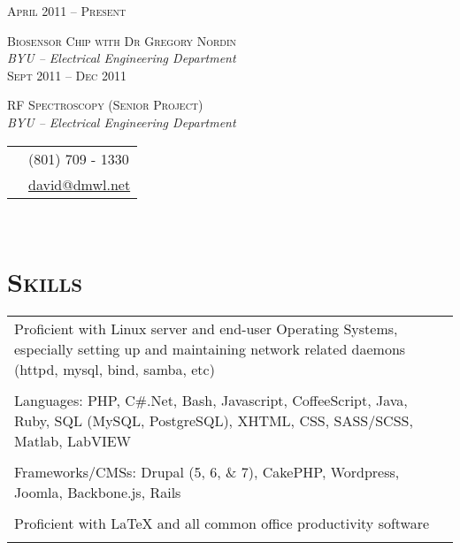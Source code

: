 \documentclass[10pt]{article}
\begin{document}
{\begin{minipage}[t]{0.5\textwidth}
	\raggedleft
	\textsc{\normalsize April 2011 -- Present}\par

	\raggedright\large \textsc{Biosensor Chip with Dr Gregory Nordin}\\
  \emph{BYU -- Electrical Engineering Department}\\[5pt]


	\raggedleft
	\textsc{\normalsize Sept 2011 -- Dec 2011}\par

	\raggedright\large \textsc{RF Spectroscopy (Senior Project)}\\
  \emph{BYU -- Electrical Engineering Department}\\[5pt]


\end{minipage} %
\hfill
\begin{minipage}[t]{0.44\textwidth} %
	
	\vspace{0pt} %
	
\colorbox{shade}{\textcolor{text1}{
	\begin{tabular}{c|p{7cm}}
		\raisebox{-3pt}{\Phone}  		&(801) 709 - 1330\\
		\raisebox{-3pt}{\Envelope} 	&\href{mailto:david@dmwl.net}
								{david@dmwl.net}
	\end{tabular}
	}
}\\[10pt]

\section{\textsc{Skills}}

	\begin{tabular}{p{8cm}}
    Proficient with Linux server and end-user Operating Systems, especially setting up and maintaining network related daemons (httpd, mysql, bind, samba, etc)\\\\
    Languages: PHP, C\#.Net, Bash, Javascript, CoffeeScript, Java, Ruby, SQL (MySQL, PostgreSQL), XHTML, CSS, SASS/SCSS, Matlab, LabVIEW\\\\
    Frameworks/CMSs: Drupal (5, 6, \& 7), CakePHP, Wordpress, Joomla, Backbone.js, Rails\\\\
    Proficient with \LaTeX{} and all common office productivity software\\\\
	\end{tabular}
	

\end{minipage}}
\end{document}
